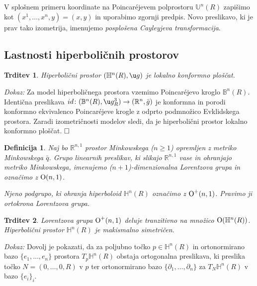 \documentclass[a4paper]{article}
\newtheorem{definicija}{Definicija}
\newtheorem{trditev}{Trditev}
\def\qed{$\hfill\Box$}   %
\begin{document}
V splošnem primeru koordinate na Poincar\'ejevem polprostoru $\mathbb{U}^{n}(R)$ zapišimo kot $(x^{1}, \dots , x^{n}, y) = (x,y)$ in uporabimo zgornji predpis. Novo preslikavo, ki je prav tako izometrija, imenujemo \emph{posplošena Cayleyjeva transformacija}.

\subsection{Lastnosti hiperboličnih prostorov}

\begin{trditev}
Hiperbolični prostor $(\mathbb{H}^{n}(R), \u g)$ je lokalno konformno ploščat.
\end{trditev}

\noindent
{\em Dokaz:\/} 
Za model hiperboličnega prostora vzemimo Poincar\'ejevo kroglo  $\mathbb{B}^{n}(R)$. Identična preslikava $id \colon (\mathbb{B}^{n}(R), \u g_{R}^{3}) \to (\mathbb{R}^{n}, \bar{g})$ je konformna in porodi konformno ekvivalenco Poincar\'ejeve krogle z odprto podmnožico Evklidskega prostora. Zaradi izometričnosti modelov sledi, da je hiperbolični prostor lokalno konformno ploščat.
\qed

\begin{definicija}
Naj bo $\mathbb{R}^{n,1}$ prostor Minkowskega ($n \geq 1$) opremljen z metriko Minkowskega $\bar{q}$. Grupo linearnih preslikav, ki slikajo $\mathbb{R}^{n,1}$ vase in ohranjajo metriko Minkowskega, imenujemo \emph{($n+1$)-dimenzionalna Lorentzova grupa} in označimo z $\textup{O}(n,1)$.

Njeno podgrupo, ki ohranja hiperboloid $\mathbb{H}^{n}(R)$ označimo z $\textup{O}^{+}(n,1)$. Pravimo ji \emph{ortokrona Lorentzova grupa}.
\end{definicija}

\begin{trditev} \label{trd: frame-homo}
Lorentzova grupa $\textup{O}^{+}(n,1)$ deluje tranzitivno na množico $\textup{O}(\mathbb{H}^{n}(R))$. Hiperbolični prostor $\mathbb{H}^{n}(R)$ je makismalno simetričen.
\end{trditev}

\noindent
{\em Dokaz:\/} 
Dovolj je pokazati, da za poljubno točko $p \in \mathbb{H}^{n}(R)$ in ortonormirano bazo $\{e_{1}, \dots , e_{n} \}$ prostora $T_{p}\mathbb{H}^{n}(R)$ obstaja ortogonalna preslikava, ki preslika točko $N=(0, \dots , 0, R)$ v $p$ ter ortonormirano bazo $\{\partial_{1}, \dots , \partial_{n} \}$ za $T_{N}\mathbb{H}^{n}(R)$ v bazo $\{e_{i}\}_{i}$.
\end{document}
